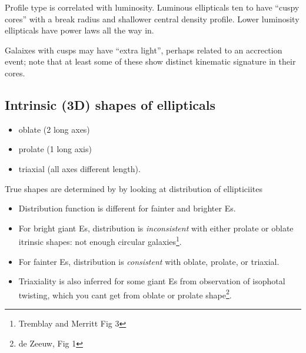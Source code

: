 \documentclass{article}
\begin{document}
Profile type is correlated with luminosity. Luminous
ellipticals ten to have ``cuspy cores'' with a break radius and
shallower central density profile. Lower luminosity ellipticals
have power laws all the way in.

Galaixes with cusps may have ``extra light'', perhaps related to an accrection
event; note that at least some of these show distinct kinematic signature in
their cores.

\subsection{Intrinsic (3D) shapes of ellipticals}
\begin{itemize}
    \item oblate (2 long axes)
    \item prolate (1 long axis)
    \item triaxial (all axes different length).
\end{itemize}
True shapes are determined by by looking at distribution of ellipticiites
\begin{itemize}
    \item Distribution function is different for fainter and
        brighter Es.
    \item For bright giant Es, distribution is \emph{inconsistent} with
        either prolate or oblate itrinsic shapes: not enough circular
        galaxies\footnote{Tremblay and Merritt Fig 3}.
    \item For fainter Es, distribution is \emph{consistent} with
        oblate, prolate, or triaxial.
    \item Triaxiality is also inferred for some giant Es from
        observation of isophotal twisting, which you cant get from
        oblate or prolate shape\footnote{de Zeeuw, Fig 1}.
\end{itemize}
\end{document}
